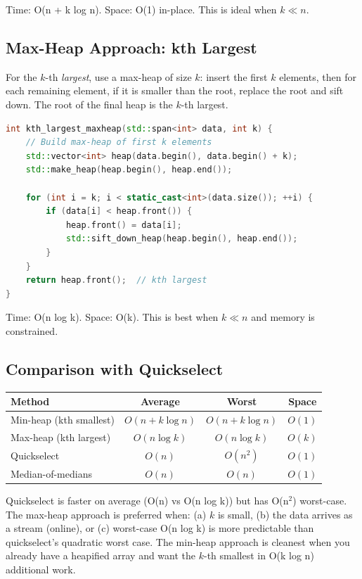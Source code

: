 Time: O(n + k log n). Space: O(1) in-place. This is ideal when $k \ll n$.

\subsection{Max-Heap Approach: kth Largest}

For the $k$-th \emph{largest}, use a max-heap of size $k$: insert the first $k$ elements, then for each remaining element, if it is smaller than the root, replace the root and sift down. The root of the final heap is the $k$-th largest.

\begin{lstlisting}[language=C++]
int kth_largest_maxheap(std::span<int> data, int k) {
    // Build max-heap of first k elements
    std::vector<int> heap(data.begin(), data.begin() + k);
    std::make_heap(heap.begin(), heap.end());

    for (int i = k; i < static_cast<int>(data.size()); ++i) {
        if (data[i] < heap.front()) {
            heap.front() = data[i];
            std::sift_down_heap(heap.begin(), heap.end());
        }
    }
    return heap.front();  // kth largest
}
\end{lstlisting}

Time: O(n log k). Space: O(k). This is best when $k \ll n$ and memory is constrained.

\subsection{Comparison with Quickselect}

\begin{center}
\begin{tabular}{lccc}
\hline
\textbf{Method} & \textbf{Average} & \textbf{Worst} & \textbf{Space} \\
\hline
Min-heap (kth smallest) & $O(n + k \log n)$ & $O(n + k \log n)$ & $O(1)$ \\
Max-heap (kth largest)  & $O(n \log k)$     & $O(n \log k)$     & $O(k)$ \\
Quickselect              & $O(n)$            & $O(n^2)$          & $O(1)$ \\
Median-of-medians        & $O(n)$            & $O(n)$            & $O(1)$ \\
\hline
\end{tabular}
\end{center}

Quickselect is faster on average (O(n) vs O(n log k)) but has O(n$^2$) worst-case. The max-heap approach is preferred when: (a) $k$ is small, (b) the data arrives as a stream (online), or (c) worst-case O(n log k) is more predictable than quickselect's quadratic worst case. The min-heap approach is cleanest when you already have a heapified array and want the $k$-th smallest in O(k log n) additional work.

